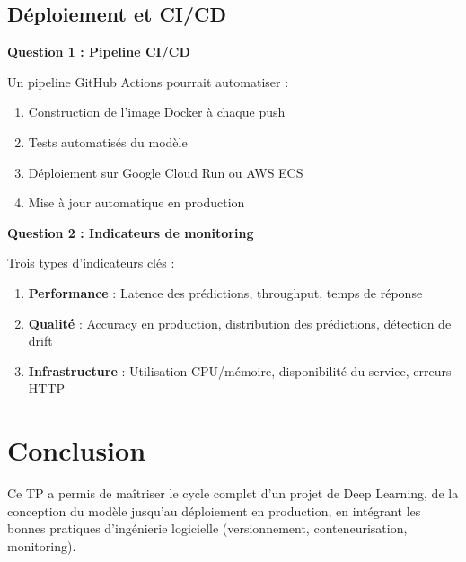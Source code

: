 \documentclass[12pt,a4paper]{article}
\begin{document}
\subsection{Déploiement et CI/CD}

\textbf{Question 1 : Pipeline CI/CD}

Un pipeline GitHub Actions pourrait automatiser :
\begin{enumerate}
    \item Construction de l'image Docker à chaque push
    \item Tests automatisés du modèle
    \item Déploiement sur Google Cloud Run ou AWS ECS
    \item Mise à jour automatique en production
\end{enumerate}

\textbf{Question 2 : Indicateurs de monitoring}

Trois types d'indicateurs clés :
\begin{enumerate}
    \item \textbf{Performance} : Latence des prédictions, throughput, temps de réponse
    \item \textbf{Qualité} : Accuracy en production, distribution des prédictions, détection de drift
    \item \textbf{Infrastructure} : Utilisation CPU/mémoire, disponibilité du service, erreurs HTTP
\end{enumerate}

\section{Conclusion}
Ce TP a permis de maîtriser le cycle complet d'un projet de Deep Learning, de la conception du modèle jusqu'au déploiement en production, en intégrant les bonnes pratiques d'ingénierie logicielle (versionnement, conteneurisation, monitoring).
\end{document}
